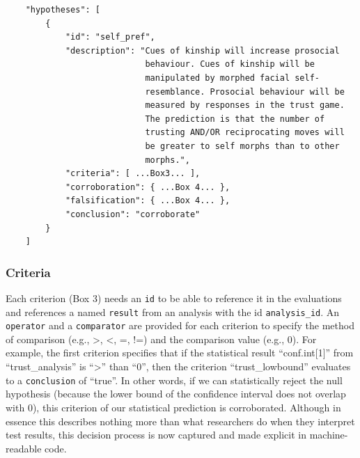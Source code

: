 \documentclass[
  english,
  doc,floatsintext]{apa6}
\begin{document}
\begin{tcolorbox}[colback=black!5!white,colframe=white!5!black,title=Box 2. The hypothesis component.]
\begin{verbatim}
    "hypotheses": [
        {
            "id": "self_pref",
            "description": "Cues of kinship will increase prosocial
                            behaviour. Cues of kinship will be
                            manipulated by morphed facial self-
                            resemblance. Prosocial behaviour will be
                            measured by responses in the trust game.
                            The prediction is that the number of
                            trusting AND/OR reciprocating moves will 
                            be greater to self morphs than to other
                            morphs.",
            "criteria": [ ...Box3... ],
            "corroboration": { ...Box 4... },
            "falsification": { ...Box 4... },
            "conclusion": "corroborate"
        }
    ]
\end{verbatim}
\end{tcolorbox}

\hypertarget{criteria}{%
\subsubsection{Criteria}\label{criteria}}

Each criterion (Box 3) needs an \texttt{id} to be able to reference it in the evaluations and references a named \texttt{result} from an analysis with the id \texttt{analysis\_id}. An \texttt{operator} and a \texttt{comparator} are provided for each criterion to specify the method of comparison (e.g., \textgreater, \textless, =, !=) and the comparison value (e.g., 0). For example, the first criterion specifies that if the statistical result \enquote{conf.int{[}1{]}} from \enquote{trust\_analysis} is \enquote{\textgreater{}} than \enquote{0}, then the criterion \enquote{trust\_lowbound} evaluates to a \texttt{conclusion} of \enquote{true}. In other words, if we can statistically reject the null hypothesis (because the lower bound of the confidence interval does not overlap with 0), this criterion of our statistical prediction is corroborated. Although in essence this describes nothing more than what researchers do when they interpret test results, this decision process is now captured and made explicit in machine-readable code.
\end{document}

